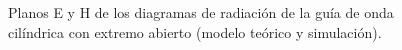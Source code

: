 \begin{figure} [H]
\centering 
{}
\hspace{5mm}
\caption{Planos E y H de los diagramas de radiación de la guía de onda cilíndrica con extremo abierto (modelo teórico y simulación).}
\label{grup_fig_estudio:13}
\end{figure}
